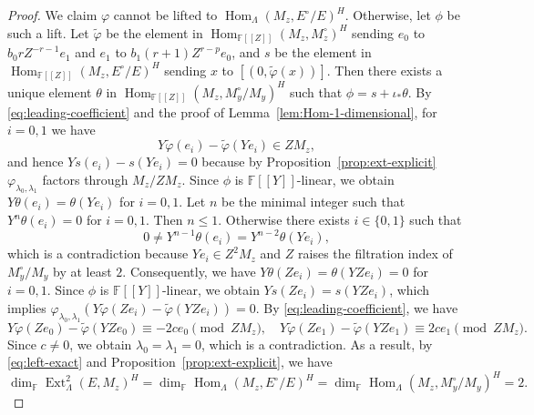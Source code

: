 \documentclass[11pt,a4paper]{article} %
\def\FF{\mathbb{F}}
\def\dim{\operatorname{dim}}
\def\Ext{\operatorname{Ext}} %
\def\Hom{\operatorname{Hom}}
\begin{document}
\begin{proof}
    We claim $\varphi$ cannot be lifted to $\Hom_{\Lambda}(M_z,E^\circ/E)^H$. Otherwise, let $\phi$ be such a lift. Let $\widetilde{\varphi}$ be the element in $\Hom_{\FF[[Z]]}(M_z,M_z^\circ)^H$ sending $e_0$ to $b_0rZ^{-r-1}e_1$ and $e_1$ to $b_1(r+1)Z^{r-p}e_0$, and $s$ be the element in $\Hom_{\FF[[Z]]}(M_z,E^\circ/E)^H$ sending $x$ to $[\left(0,\widetilde{\varphi}(x)\right)]$. Then there exists a unique element $\theta$ in $\Hom_{\FF[[Z]]}(M_z,M_y^\circ/M_y)^H$ such that $\phi=s+\iota_*\theta$. By \eqref{eq:leading-coefficient} and the proof of Lemma~\ref{lem:Hom-1-dimensional}, for $i=0,1$ we have
    \[
    Y\widetilde{\varphi}(e_i)-\widetilde{\varphi}(Ye_i)\in ZM_z,
    \]
    and hence $Ys(e_i)-s(Ye_i)=0$ because by Proposition~\ref{prop:ext-explicit} $\varphi_{\lambda_0,\lambda_1}$ factors through $M_z/ZM_z$. Since $\phi$ is $\FF[[Y]]$-linear, we obtain $Y\theta(e_i)=\theta(Ye_i)$ for $i=0,1$. Let $n$ be the minimal integer such that $Y^n\theta(e_i)=0$ for $i=0,1$. Then $n\le 1$. Otherwise there exists $i\in\{0,1\}$ such that
    \[
    0\ne Y^{n-1}\theta(e_i)=Y^{n-2}\theta(Ye_i),
    \]
    which is a contradiction because $Ye_i\in Z^2M_z$ and $Z$ raises the filtration index of $M_y^\circ/M_y$ by at least $2$. Consequently, we have $Y\theta(Ze_i)=\theta(YZe_i)=0$ for $i=0,1$. Since $\phi$ is $\FF[[Y]]$-linear, we obtain $Ys(Ze_i)=s(YZe_i)$, which implies $\varphi_{\lambda_0,\lambda_1}\left(Y\widetilde{\varphi}(Ze_i)-\widetilde{\varphi}(YZe_i)\right)=0$. By \eqref{eq:leading-coefficient}, we have 
    \[
    Y\widetilde{\varphi}(Ze_0)-\widetilde{\varphi}(YZe_0)\equiv-2ce_0\pmod{ZM_z},\quad Y\widetilde{\varphi}(Ze_1)-\widetilde{\varphi}(YZe_1)\equiv2ce_1\pmod{ZM_z}.
    \]
    Since $c\ne0$, we obtain $\lambda_0=\lambda_1=0$, which is a contradiction. As a result, by \eqref{eq:left-exact} and Proposition~\ref{prop:ext-explicit}, we have
    \[
    \dim_\FF\Ext^2_{\Lambda}(E,M_z)^H=\dim_\FF\Hom_{\Lambda}(M_z,E^\circ/E)^H=\dim_\FF\Hom_{\Lambda}(M_z,M_y^\circ/M_y)^H=2.
    \]


\end{proof}
\end{document}
